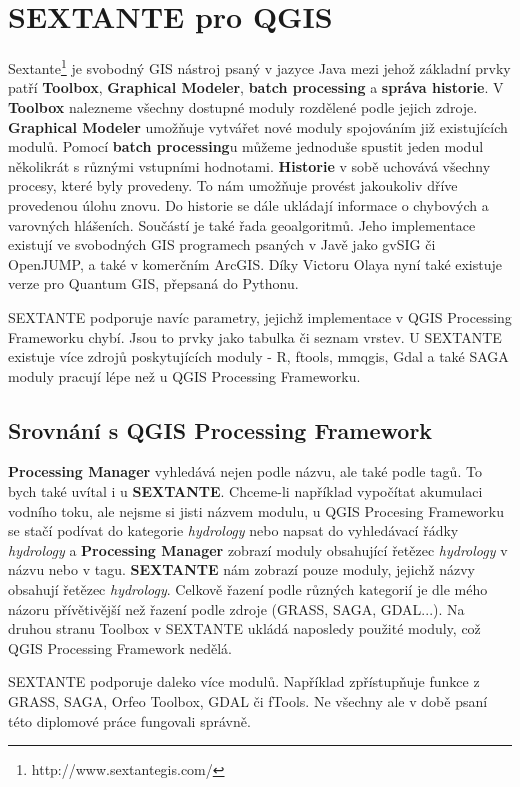 \newpage
\chapter{SEXTANTE pro QGIS}
Sextante\footnote{http://www.sextantegis.com/} je svobodný GIS nástroj psaný v jazyce Java mezi jehož základní prvky patří \textbf{Toolbox}, \textbf{Graphical Modeler}, \textbf{batch processing} a \textbf{správa historie}. V \textbf{Toolbox} nalezneme všechny dostupné moduly rozdělené podle jejich zdroje. \textbf{Graphical Modeler} umožňuje vytvářet nové moduly spojováním již existujících modulů. Pomocí \textbf{batch processing}u můžeme jednoduše spustit jeden modul několikrát s různými vstupními hodnotami. \textbf{Historie} v sobě uchovává všechny procesy, které byly provedeny. To nám umožňuje provést jakoukoliv dříve provedenou úlohu znovu. Do historie se dále ukládají informace o chybových a varovných hlášeních. Součástí je také řada geoalgoritmů. Jeho implementace existují ve svobodných GIS programech psaných v Javě jako gvSIG či OpenJUMP, a také v komerčním ArcGIS. Díky Victoru Olaya nyní také existuje verze pro Quantum GIS, přepsaná do Pythonu.

SEXTANTE podporuje navíc parametry, jejichž implementace v QGIS Processing Frameworku chybí. Jsou to prvky jako tabulka či seznam vrstev. U SEXTANTE existuje více zdrojů poskytujících moduly - R, ftools, mmqgis, Gdal a také SAGA moduly pracují lépe než u QGIS Processing Frameworku.

\section{Srovnání s QGIS Processing Framework}
\textbf{Processing Manager} vyhledává nejen podle názvu, ale také podle tagů. To bych také uvítal i u \textbf{SEXTANTE}. Chceme-li například vypočítat akumulaci vodního toku, ale nejsme si jisti názvem modulu, u QGIS Procesing Frameworku se stačí podívat do kategorie \textit{hydrology} nebo napsat do vyhledávací řádky \textit{hydrology} a \textbf{Processing Manager} zobrazí moduly obsahující řetězec \textit{hydrology} v názvu nebo v tagu. \textbf{SEXTANTE} nám zobrazí pouze moduly, jejichž názvy obsahují řetězec \textit{hydrology}. Celkově řazení podle různých kategorií je dle mého názoru přívětivější než řazení podle zdroje (GRASS, SAGA, GDAL...). Na druhou stranu Toolbox v SEXTANTE ukládá naposledy použité moduly, což QGIS Processing Framework nedělá. 

SEXTANTE podporuje daleko více modulů. Například zpřístupňuje funkce z GRASS, SAGA, Orfeo Toolbox, GDAL či fTools. Ne všechny ale v době psaní této diplomové práce fungovali správně. 

